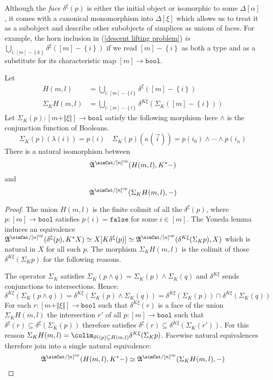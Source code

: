 \documentclass{tac}
\newcommand\set[1]{\left\{#1\right\}}
\newcommand\ri{^*}
\newcommand\dual{^{\mathrm{op}}}
\newcommand\of{:}
\newcommand\simplex\Delta
\newcommand\false{\mathtt{false}}
\newcommand\bool{\mathtt{bool}}
\newcommand\norm[1]{\Vert #1 \Vert}
\newcommand\ka\kappa
\newcommand\la\lambda
\newcommand\depsum{\Sigma_}
\newcommand\face\delta
\newcommand\ambient{\mathfrak A}
\begin{document}
Although the \emph{face} $\face^\xi(p)$ is either the initial object or isomorphic to some $\simplex[\alpha]$, it comes with a canonical monomorphism into $\simplex[\xi]$ which allows us to treat it as a subobject and describe other subobjects of simplices as unions of faces. For example, the horn inclusion in (\ref{descent lifting problem}) \emph{is} $\bigcup_{i\of [m]-\set k} \face^\xi([m]-\set i)$ if we read $[m]-\set i$ as both a type and as a substitute for its characteristic map $[m]\to\bool$.


\begin{proposition} Let
\begin{align*}
H(m,l)&=\bigcup_{i\of [m]-\set l} \face^\xi([m]-\set i)\\
\depsum KH(m,l)&=\bigcup_{i\of [m]-\set l} \face^{K\xi}(\depsum K([m]-\set i))
\end{align*}
Let $\depsum K(p)\of [m+\norm\xi]\to \bool$ satisfy the following morphism--here $\mathord\land$ is the conjunction function of Booleans.
\[ \depsum K(p)(\la(i))=p(i)\quad\depsum K(p)(\ka(\vec i)) = p(i_0)\land\dotsm\land p(i_n) \] 
There is a natural isomorphism between
\[ \ambient^{\simCat/[n]\dual}(H(m,l),K\ri -) \] and 
\[ \ambient^{\simCat/[n]\dual}(\depsum KH(m,l),-) \] \label{K-universal}
\end{proposition}


\begin{proof} The union $H(m,l)$ is the finite colimit of all the $\face^\xi(p)$, where $p\of[m]\to\bool$ satisfies $p(i)=\false$ for some $i\in [m]$. The Yoneda lemma induces an equivalence $\ambient^{\simCat/[n]\dual}(\face^\xi(p),K\ri X)\simeq X[K\face^\xi(p)]\simeq \ambient^{\simCat/[n]\dual}(\face^{K\xi}(\depsum K p),X)$ which is natural in $X$ for all such $p$. The morphism $\depsum KH(m,l)$ is the colimit of those $\face^{K\xi}(\depsum K p)$ for the following reasons.

The operator $\depsum K$ satisfies $\depsum K(p\land q)=\depsum K(p)\land \depsum K(q)$ and $\face^{K\xi}$ sends conjunctions to intersections. Hence:
\[ \face^{K\xi}(\depsum K(p\land q)) = \face^{K\xi}(\depsum K(p)\land \depsum K(q)) = \face^{K\xi}(\depsum K(p))\cap \face^{K\xi}(\depsum K(q)) \]
For each $r\of[m+\norm\xi]\to \bool$ such that $\face^{K\xi}(r)$ is a face of the union $\depsum KH(m,l)$ the intersection $r'$ of all $p\of[m]\to \bool$ such that $\face^\xi(r)\subseteq\face^\xi(\depsum K(p))$ therefore satisfies $\face^\xi(r)\subseteq \face^{K\xi}(\depsum K(r'))$. For this reason $\depsum KH(m,l)=\colim_{\face^\xi(p)\subseteq H(m,l)}\face^{K\xi}(\depsum K p)$. Facewise natural equivalences therefore join into a single natural equivalence:
\[ \ambient^{\simCat/[n]\dual}(H(m,l),K\ri -)\simeq\ambient^{\simCat/[n]\dual}(\depsum K H(m,l), -) \]
\end{proof}
\end{document}
